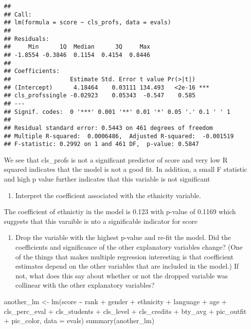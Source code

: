 \documentclass[
]{article}
\newenvironment{Shaded}{\begin{snugshade}}{\end{snugshade}}
\newcommand{\AttributeTok}[1]{\textcolor[rgb]{0.77,0.63,0.00}{#1}}
\newcommand{\FunctionTok}[1]{\textcolor[rgb]{0.00,0.00,0.00}{#1}}
\newcommand{\NormalTok}[1]{#1}
\newcommand{\OtherTok}[1]{\textcolor[rgb]{0.56,0.35,0.01}{#1}}
\newcommand{\SpecialCharTok}[1]{\textcolor[rgb]{0.00,0.00,0.00}{#1}}
\providecommand{\tightlist}{%
  \setlength{\itemsep}{0pt}\setlength{\parskip}{0pt}}
\begin{document}
\begin{verbatim}
## 
## Call:
## lm(formula = score ~ cls_profs, data = evals)
## 
## Residuals:
##     Min      1Q  Median      3Q     Max 
## -1.8554 -0.3846  0.1154  0.4154  0.8446 
## 
## Coefficients:
##                 Estimate Std. Error t value Pr(>|t|)    
## (Intercept)      4.18464    0.03111 134.493   <2e-16 ***
## cls_profssingle -0.02923    0.05343  -0.547    0.585    
## ---
## Signif. codes:  0 '***' 0.001 '**' 0.01 '*' 0.05 '.' 0.1 ' ' 1
## 
## Residual standard error: 0.5443 on 461 degrees of freedom
## Multiple R-squared:  0.0006486,  Adjusted R-squared:  -0.001519 
## F-statistic: 0.2992 on 1 and 461 DF,  p-value: 0.5847
\end{verbatim}

We see that cls\_profs is not a significant predictor of score and very
low R squared indicates that the model is not a good fit. In addition, a
small F statistic and high p value further indicates that this variable
is not significant

\begin{enumerate}
\def\labelenumi{\arabic{enumi}.}
\setcounter{enumi}{12}
\tightlist
\item
  Interpret the coefficient associated with the ethnicity variable.
\end{enumerate}

The coefficient of ethnictiy in the model is 0.123 with p-value of
0.1169 which suggests that this varaible is nto a significable indicator
for score

\begin{enumerate}
\def\labelenumi{\arabic{enumi}.}
\setcounter{enumi}{13}
\tightlist
\item
  Drop the variable with the highest p-value and re-fit the model. Did
  the coefficients and significance of the other explanatory variables
  change? (One of the things that makes multiple regression interesting
  is that coefficient estimates depend on the other variables that are
  included in the model.) If not, what does this say about whether or
  not the dropped variable was collinear with the other explanatory
  variables?
\end{enumerate}

\begin{Shaded}
\begin{Highlighting}[]
\NormalTok{another\_lm }\OtherTok{\textless{}{-}} \FunctionTok{lm}\NormalTok{(score }\SpecialCharTok{\textasciitilde{}}\NormalTok{ rank }\SpecialCharTok{+}\NormalTok{ gender }\SpecialCharTok{+}\NormalTok{ ethnicity }\SpecialCharTok{+}\NormalTok{ language }\SpecialCharTok{+}\NormalTok{ age }\SpecialCharTok{+}\NormalTok{ cls\_perc\_eval }\SpecialCharTok{+}
\NormalTok{    cls\_students }\SpecialCharTok{+}\NormalTok{ cls\_level }\SpecialCharTok{+}\NormalTok{ cls\_credits }\SpecialCharTok{+}\NormalTok{ bty\_avg }\SpecialCharTok{+}\NormalTok{ pic\_outfit }\SpecialCharTok{+}\NormalTok{ pic\_color, }\AttributeTok{data =}\NormalTok{ evals)}
\FunctionTok{summary}\NormalTok{(another\_lm)}
\end{Highlighting}
\end{Shaded}
\end{document}
